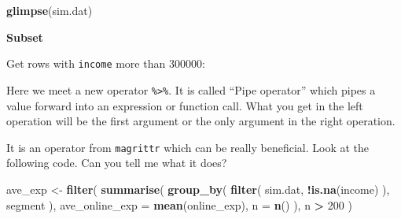 \documentclass[12pt,]{krantz}
\makeatletter
\newenvironment{Shaded}{\begin{snugshade}}{\end{snugshade}}
\newcommand{\DataTypeTok}[1]{\textcolor[rgb]{0.27,0.27,0.27}{#1}}
\newcommand{\DecValTok}[1]{\textcolor[rgb]{0.06,0.06,0.06}{#1}}
\newcommand{\KeywordTok}[1]{\textcolor[rgb]{0.27,0.27,0.27}{\textbf{#1}}}
\newcommand{\NormalTok}[1]{#1}
\newcommand{\OperatorTok}[1]{\textcolor[rgb]{0.43,0.43,0.43}{\textbf{#1}}}
\newcommand{\StringTok}[1]{\textcolor[rgb]{0.5,0.5,0.5}{#1}}
\newenvironment{kframe}{%
\medskip{}
\setlength{\fboxsep}{.8em}
 \def\at@end@of@kframe{}%
 \ifinner\ifhmode%
  \def\at@end@of@kframe{\end{minipage}}%
  \begin{minipage}{\columnwidth}%
 \fi\fi%
 \def\FrameCommand##1{\hskip\@totalleftmargin \hskip-\fboxsep
 \colorbox{shadecolor}{##1}\hskip-\fboxsep
     \hskip-\linewidth \hskip-\@totalleftmargin \hskip\columnwidth}%
 \MakeFramed {\advance\hsize-\width
   \@totalleftmargin\z@ \linewidth\hsize
   \@setminipage}}%
 {\par\unskip\endMakeFramed%
 \at@end@of@kframe}
\renewenvironment{Shaded}{\begin{kframe}}{\end{kframe}}
\makeatother
\begin{document}
\begin{Shaded}
\begin{Highlighting}[]
\KeywordTok{glimpse}\NormalTok{(sim.dat)}
\end{Highlighting}
\end{Shaded}

\textbf{Subset}

Get rows with \texttt{income} more than 300000:

\begin{Shaded}
\end{Shaded}

Here we meet a new operator \texttt{\%\textgreater{}\%}. It is called ``Pipe operator'' which pipes a value forward into an expression or function call. What you get in the left operation will be the first argument or the only argument in the right operation.

\begin{Shaded}
\end{Shaded}

It is an operator from \texttt{magrittr} which can be really beneficial. Look at the following code. Can you tell me what it does?

\begin{Shaded}
\begin{Highlighting}[]
\NormalTok{ave_exp <-}\StringTok{ }\KeywordTok{filter}\NormalTok{( }
  \KeywordTok{summarise}\NormalTok{(}
    \KeywordTok{group_by}\NormalTok{( }
      \KeywordTok{filter}\NormalTok{(}
\NormalTok{        sim.dat, }
        \OperatorTok{!}\KeywordTok{is.na}\NormalTok{(income)}
\NormalTok{      ), }
\NormalTok{      segment}
\NormalTok{    ), }
    \DataTypeTok{ave_online_exp =} \KeywordTok{mean}\NormalTok{(online_exp), }
    \DataTypeTok{n =} \KeywordTok{n}\NormalTok{()}
\NormalTok{  ), }
\NormalTok{  n }\OperatorTok{>}\StringTok{ }\DecValTok{200}
\NormalTok{) }
\end{Highlighting}
\end{Shaded}
\end{document}
